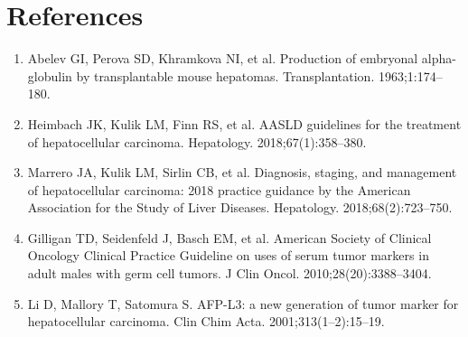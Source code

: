 \section*{References}
\begin{enumerate}
  \item Abelev GI, Perova SD, Khramkova NI, et al. Production of embryonal alpha-globulin by transplantable mouse hepatomas. Transplantation. 1963;1:174--180.
  \item Heimbach JK, Kulik LM, Finn RS, et al. AASLD guidelines for the treatment of hepatocellular carcinoma. Hepatology. 2018;67(1):358--380.
  \item Marrero JA, Kulik LM, Sirlin CB, et al. Diagnosis, staging, and management of hepatocellular carcinoma: 2018 practice guidance by the American Association for the Study of Liver Diseases. Hepatology. 2018;68(2):723--750.
  \item Gilligan TD, Seidenfeld J, Basch EM, et al. American Society of Clinical Oncology Clinical Practice Guideline on uses of serum tumor markers in adult males with germ cell tumors. J Clin Oncol. 2010;28(20):3388--3404.
  \item Li D, Mallory T, Satomura S. AFP-L3: a new generation of tumor marker for hepatocellular carcinoma. Clin Chim Acta. 2001;313(1--2):15--19.
\end{enumerate}

\clearpage
